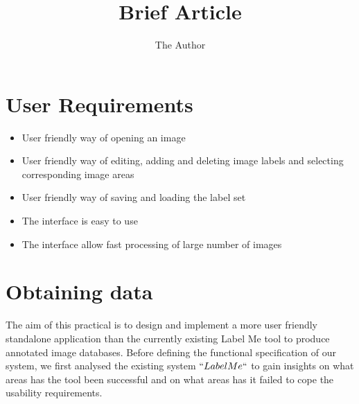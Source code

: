 \documentclass[11pt]{amsart}
\title{Brief Article}
\author{The Author}
\begin{document}
\maketitle

\section {User Requirements}
\begin{itemize}
\item  User friendly way of opening an image
\item  User friendly way of editing, adding and deleting image labels and selecting corresponding image
areas
\item  User friendly way of saving and loading the label set
\item The interface is easy to use
\item The interface allow fast processing of large number of images
\end{itemize}

\section {Obtaining data}
The aim of this practical is to design  and implement  a more user friendly standalone application than the  currently existing Label Me tool  to produce annotated image databases.  Before defining the functional specification of our system, we first  analysed the existing system \(``Label Me ``\) to gain insights on what areas has the tool  been successful and on what areas has it failed to cope the usability requirements.
\end{document}
